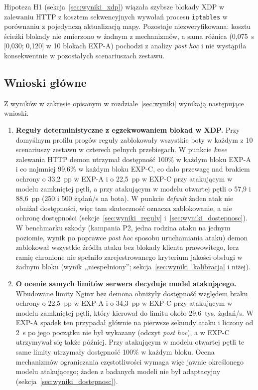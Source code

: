 \documentclass[a4paper,12pt]{article}
\begin{document}
Hipoteza H1 (sekcja~\ref{sec:wyniki_xdp}) wiązała szybsze blokady XDP w zalewaniu HTTP z kosztem sekwencyjnych wywołań procesu \texttt{iptables} w porównaniu z pojedynczą aktualizacją mapy. Pozostaje niezweryfikowana: kosztu ścieżki blokady nie zmierzono w żadnym z mechanizmów, a sama różnica (0,075~s [0,030; 0,120] w 10 blokach EXP-A) pochodzi z analizy \textit{post hoc} i nie wystąpiła konsekwentnie w pozostałych scenariuszach zestawu.

\subsection{Wnioski główne}\label{sec:wnioski_glowne}
Z wyników w zakresie opisanym w rozdziale~\ref{sec:wyniki} wynikają następujące wnioski.
\begin{enumerate}
    \item \textbf{Reguły deterministyczne z egzekwowaniem blokad w XDP.} Przy domyślnym profilu progów reguły zablokowały wszystkie boty w każdym z 10 scenariuszy zestawu w czterech pełnych przebiegach. W punkcie \textit{knee} zalewania HTTP demon utrzymał dostępność 100\% w każdym bloku EXP-A i co najmniej 99,6\% w każdym bloku EXP-C, co dało przewagę nad brakiem ochrony o 33,2~pp w EXP-A i o 22,5~pp w EXP-C przy atakującym w modelu zamkniętej pętli, a przy atakującym w modelu otwartej pętli o 57,9 i 88,6~pp (250 i 500 żądań/s na bota). W punkcie \textit{default} żaden atak nie obniżał dostępności, więc tam skuteczność oznacza zablokowanie, a nie ochronę dostępności (sekcje~\ref{sec:wyniki_reguly} i~\ref{sec:wyniki_dostepnosc}). W benchmarku szkody (kampania P2, jedna rodzina ataku na jednym poziomie, wynik po poprawce \textit{post hoc} sposobu uruchamiania ataku) demon zablokował wszystkie źródła ataku bez blokady klienta prawowitego, lecz ramię chronione nie spełniło zarejestrowanego kryterium jakości obsługi w żadnym bloku (wynik ,,niespełniony''; sekcja~\ref{sec:wyniki_kalibracja} i niżej).
    \item \textbf{O ocenie samych limitów serwera decyduje model atakującego.} Wbudowane limity Nginx bez demona obniżyły dostępność względem braku ochrony o 22,5~pp w EXP-A i o 34,3~pp w EXP-C przy atakującym w modelu zamkniętej pętli, który kierował do limitu około 29,6~tys. żądań/s. W EXP-A spadek ten przypadał głównie na pierwsze sekundy ataku i liczony od 2~s po jego początku nie był wykazany (odczyt \textit{post hoc}), a w EXP-C utrzymywał się także później. Przy atakującym w modelu otwartej pętli te same limity utrzymały dostępność 100\% w każdym bloku. Ocena mechanizmów ograniczania częstotliwości wymaga więc jawnie określonego modelu atakującego; żaden z badanych modeli nie był adaptacyjny (sekcja~\ref{sec:wyniki_dostepnosc}).

\end{enumerate}
\end{document}

